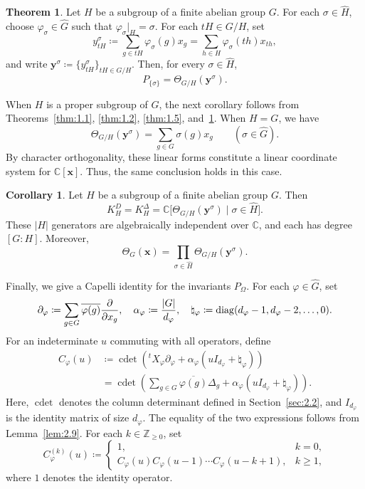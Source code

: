 \documentclass[12pt,a4paper]{article}
\theoremstyle{definition}
\newtheorem{thm}[definition]{Theorem}
\newtheorem{cor}[definition]{Corollary}
\numberwithin{definition}{section}
\newcommand{\diag}{{\rm diag}}
\DeclareMathOperator{\Cdet}{cdet}
\begin{document}
\begin{thm}\label{thm:1.7}
Let $H$ be a subgroup of a finite abelian group $G$.
For each $\sigma\in\widehat H$, choose $\varphi_\sigma\in\widehat G$
such that $\varphi_\sigma|_H=\sigma$.
For each $tH\in G/H$, set
\[
y_{tH}^\sigma\coloneqq
\sum_{g\in tH}\varphi_\sigma(g)x_g
=\sum_{h\in H}\varphi_\sigma(th)x_{th},
\]
and write $\bm y^\sigma\coloneqq\{y_{tH}^\sigma\}_{tH\in G/H}$.
Then, for every $\sigma\in\widehat H$,
\[
P_{\{\sigma\}}=\Theta_{G/H}(\bm y^\sigma).
\]
\end{thm}

When $H$ is a proper subgroup of $G$, the next corollary follows from
Theorems~\ref{thm:1.1}, \ref{thm:1.2}, \ref{thm:1.5}, and~\ref{thm:1.7}.
When $H=G$, we have
\[
\Theta_{G/H}(\bm y^\sigma)
=\sum_{g\in G}\sigma(g)x_g
\qquad(\sigma\in\widehat G).
\]
By character orthogonality, these linear forms constitute a linear coordinate
system for $\mathbb C[\bm x]$. Thus, the same conclusion holds in this case.

\begin{cor}\label{cor:1.8}
Let $H$ be a subgroup of a finite abelian group $G$. Then
\[
K_H^D=K_H^\Delta
=\mathbb C\bigl[
\Theta_{G/H}(\bm y^\sigma)
\mid\sigma\in\widehat H
\bigr].
\]
These $|H|$ generators are algebraically independent over $\mathbb C$,
and each has degree $[G:H]$.
Moreover,
\[
\Theta_G(\bm x)
=\prod_{\sigma\in\widehat H}\Theta_{G/H}(\bm y^\sigma).
\]
\end{cor}

Finally, we give a Capelli identity for the invariants $P_\Omega$.
For each $\varphi\in\widehat G$, set
\[
\partial_\varphi\coloneqq
\sum_{g\in G}\overline{\varphi(g)}\frac{\partial}{\partial x_g},
\quad
\alpha_\varphi\coloneqq\frac{|G|}{d_\varphi},
\quad
\natural_\varphi\coloneqq\diag(d_\varphi-1,d_\varphi-2,\ldots,0).
\]
For an indeterminate $u$ commuting with all operators, define
\[
\begin{aligned}
C_\varphi(u)
&\coloneqq\Cdet\left(
{}^tX_\varphi\partial_\varphi
+\alpha_\varphi(uI_{d_\varphi}+\natural_\varphi)\right)\\
&=\Cdet\left(
\sum_{g\in G}\overline{\varphi(g)}\Delta_g
+\alpha_\varphi(uI_{d_\varphi}+\natural_\varphi)\right).
\end{aligned}
\]
Here, $\Cdet$ denotes the column determinant defined in
Section~\ref{sec:2.2}, and $I_{d_\varphi}$ is the identity matrix of size
$d_\varphi$.
The equality of the two expressions follows from Lemma~\ref{lem:2.9}.
For each $k\in\mathbb Z_{\ge0}$, set
\[
C_\varphi^{(k)}(u)\coloneqq
\begin{cases}
1,&k=0,\\
C_\varphi(u)C_\varphi(u-1)\cdots C_\varphi(u-k+1),&k\ge1,
\end{cases}
\]
where $1$ denotes the identity operator.
\end{document}
